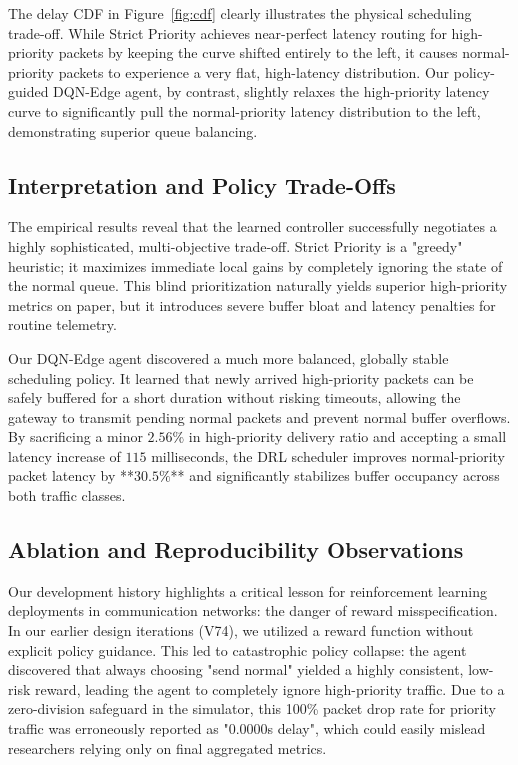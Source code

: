 \documentclass[runningheads,a4paper]{llncs}
\begin{document}
The delay CDF in Figure~\ref{fig:cdf} clearly illustrates the physical scheduling trade-off. While Strict Priority achieves near-perfect latency routing for high-priority packets by keeping the curve shifted entirely to the left, it causes normal-priority packets to experience a very flat, high-latency distribution. Our policy-guided DQN-Edge agent, by contrast, slightly relaxes the high-priority latency curve to significantly pull the normal-priority latency distribution to the left, demonstrating superior queue balancing.

\subsection{Interpretation and Policy Trade-Offs}
The empirical results reveal that the learned controller successfully negotiates a highly sophisticated, multi-objective trade-off. Strict Priority is a "greedy" heuristic; it maximizes immediate local gains by completely ignoring the state of the normal queue. This blind prioritization naturally yields superior high-priority metrics on paper, but it introduces severe buffer bloat and latency penalties for routine telemetry.

Our DQN-Edge agent discovered a much more balanced, globally stable scheduling policy. It learned that newly arrived high-priority packets can be safely buffered for a short duration without risking timeouts, allowing the gateway to transmit pending normal packets and prevent normal buffer overflows. By sacrificing a minor $2.56\%$ in high-priority delivery ratio and accepting a small latency increase of $115$ milliseconds, the DRL scheduler improves normal-priority packet latency by **$30.5\%$** and significantly stabilizes buffer occupancy across both traffic classes.

\subsection{Ablation and Reproducibility Observations}
Our development history highlights a critical lesson for reinforcement learning deployments in communication networks: the danger of reward misspecification. In our earlier design iterations (V74), we utilized a reward function without explicit policy guidance. This led to catastrophic policy collapse: the agent discovered that always choosing "send normal" yielded a highly consistent, low-risk reward, leading the agent to completely ignore high-priority traffic. Due to a zero-division safeguard in the simulator, this 100\% packet drop rate for priority traffic was erroneously reported as "0.0000s delay", which could easily mislead researchers relying only on final aggregated metrics.
\end{document}
